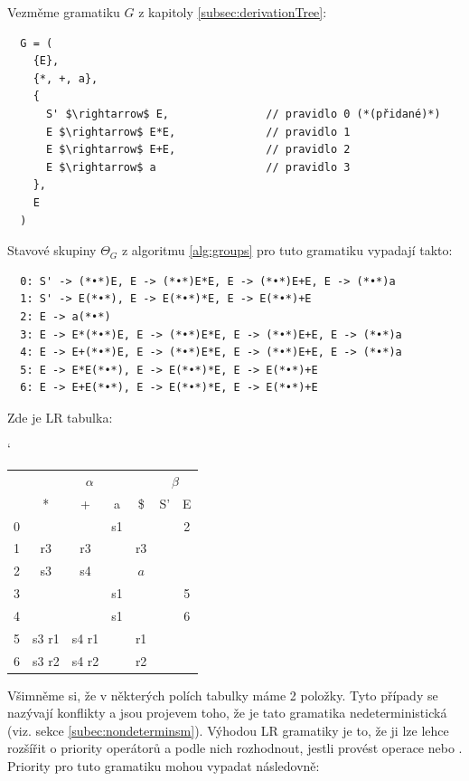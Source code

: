\begin{exmp} Vezměme gramatiku $G$ z kapitoly \ref{subsec:derivationTree}:


\begin{lstlisting}
  G = (
    {E},
    {*, +, a},
    {
      S' $\rightarrow$ E,               // pravidlo 0 (*(přidané)*)
      E $\rightarrow$ E*E,              // pravidlo 1
      E $\rightarrow$ E+E,              // pravidlo 2
      E $\rightarrow$ a                 // pravidlo 3
    },
    E
  )
\end{lstlisting}

\noindent
Stavové skupiny $\Theta_G$ z algoritmu \ref{alg:groups} pro tuto gramatiku vypadají takto:
\begin{lstlisting}
  0: S' -> (*•*)E, E -> (*•*)E*E, E -> (*•*)E+E, E -> (*•*)a
  1: S' -> E(*•*), E -> E(*•*)*E, E -> E(*•*)+E
  2: E -> a(*•*)
  3: E -> E*(*•*)E, E -> (*•*)E*E, E -> (*•*)E+E, E -> (*•*)a
  4: E -> E+(*•*)E, E -> (*•*)E*E, E -> (*•*)E+E, E -> (*•*)a
  5: E -> E*E(*•*), E -> E(*•*)*E, E -> E(*•*)+E
  6: E -> E+E(*•*), E -> E(*•*)*E, E -> E(*•*)+E
\end{lstlisting}

\noindent
Zde je LR tabulka:

\begin{table}[H]
  \catcode`
  \centering
  \begin{tabular}{| c || c | c | c | c || c | c |}
    \hline
    \multirow{2}{*}{} & \multicolumn{4}{c||}{$\alpha$}& \multicolumn{2}{c|}{$\beta$} \\
    \cline{2-7}
      & * & + & a & \$& S'& E \\
    \hhline{|=||=|=|=|=||=|=|}
    0 &   &   & s1 &   &   & 2 \\
    \hline
    1 & r3 & r3 &   & r3 &   &   \\
    \hline
    2 & s3 & s4 &   & $a$ &   &   \\
    \hline
    3 &   &   & s1 &   &   & 5 \\
    \hline
    4 &   &   & s1 &   &   & 6 \\
    \hline
    5 & s3 r1 &  s4 r1 & & r1 &   & \\
    \hline
    6 & s3 r2 &  s4 r2 & & r2 &   & \\
    \hline
  \end{tabular}
\end{table}

Všimněme si, že v některých polích tabulky máme 2 položky. Tyto případy
se nazývají  konflikty a jsou projevem toho, že je tato
gramatika nedeterministická (viz. sekce \ref{subec:nondeterminsm}).
Výhodou LR gramatiky je to, že ji lze lehce rozšířit o priority operátorů
a podle nich rozhodnout, jestli provést operace  nebo .
Priority pro tuto gramatiku mohou vypadat následovně:


\end{exmp}
